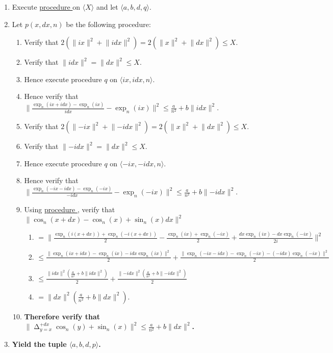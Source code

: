 \documentclass{article}
\DeclareMathOperator*{\diff}{\Delta}
\newcounter{procedure}[part]
\newcommand{\procedurehr}[1]{\hyperref[sec:procedure #1]{procedure \expandafter\csname procedure#1\endcsname}}
\begin{document}
\begin{multicols}{2}
\begin{enumerate}
					\item Execute \procedurehr{3.19} on $\langle X\rangle$ and let $\langle a,b,d,q\rangle$.
					\item Let $p(x,dx,n)$ be the following procedure:
					\begin{enumerate}
						\item Verify that $2(\lVert ix\rVert^2+\lVert idx\rVert^2)=2(\lVert x\rVert^2+\lVert dx\rVert^2)\le X$.
						\item Verify that $\lVert idx\rVert^2=\lVert dx\rVert^2\le X$.
						\item Hence execute procedure $q$ on $\langle ix,idx,n\rangle$.
						\item Hence verify that $\lVert\frac{\exp_n(ix+idx)-\exp_n(ix)}{idx}-\exp_n(ix)\rVert^2\le\frac{a}{n^2}+b\lVert idx\rVert^2$.
						\item Verify that $2(\lVert -ix\rVert^2+\lVert -idx\rVert^2)=2(\lVert x\rVert^2+\lVert dx\rVert^2)\le X$.
						\item Verify that $\lVert -idx\rVert^2=\lVert dx\rVert^2\le X$.
						\item Hence execute procedure $q$ on $\langle -ix,-idx,n\rangle$.
						\item Hence verify that $\lVert\frac{\exp_n(-ix-idx)-\exp_n(-ix)}{-idx}-\exp_n(-ix)\rVert^2\le\frac{a}{n^2}+b\lVert -idx\rVert^2$.
						\item Using \procedurehr{3.04}, verify that $\lVert\cos_n(x+dx)-\cos_n(x)+\sin_n(x)dx\rVert^2$
						\begin{enumerate}
							\item $=\lVert\frac{\exp_n(i(x+dx))+\exp_n(-i(x+dx))}{2}-\frac{\exp_n(ix)+\exp_n(-ix)}{2}+\frac{dx\exp_n(ix)-dx\exp_n(-ix)}{2i}\rVert^2$
							\item $\le\frac{\lVert\exp_n(ix+idx)-\exp_n(ix)-idx\exp_n(ix)\rVert^2}{2}+\frac{\lVert\exp_n(-ix-idx)-\exp_n(-ix)-(-idx)\exp_n(-ix)\rVert^2}{2}$
							\item $\le\frac{\lVert idx\rVert^2(\frac{a}{n^2}+b\lVert idx\rVert^2)}{2}+\frac{\lVert -idx\rVert^2(\frac{a}{n^2}+b\lVert -idx\rVert^2)}{2}$
							\item $=\lVert dx\rVert^2(\frac{a}{n^2}+b\lVert dx\rVert^2)$.
						\end{enumerate}
						\item \textbf{Therefore verify that $\lVert\diff_{y=x}^{+dx}\cos_n(y)+\sin_n(x)\rVert^2\le\frac{a}{n^2}+b\lVert dx\rVert^2$.}
					\end{enumerate}
					\item \textbf{Yield the tuple $\langle a,b,d,p\rangle$.}

\end{enumerate}
\end{multicols}
\end{document}
